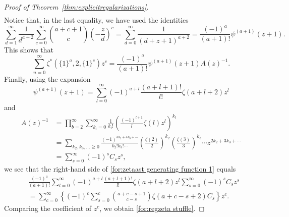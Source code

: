 \documentclass[12pt]{amsart}%
\theoremstyle{definition}
\begin{document}
\begin{proof}[Proof of Theorem~\ref{thm:explicitregularizations}]
\begin{align*}
\end{align*}
Notice that, in the last equality, 
we have used the identities 
\[
\sum^{\infty}_{d=1}\frac{1}{d^{a+2}}\sum^{\infty}_{c=0}\binom{a+c+1}{c}\left(-\frac{z}{d}\right)^c
=\sum^{\infty}_{d=0}\frac{1}{(d+z+1)^{a+2}}
=\frac{(-1)^a}{(a+1)!}\psi^{(a+1)}(z+1).
\]
This shows that 
\begin{equation}
\label{for:zetaast generating function 1}
 \sum^{\infty}_{n=0}\zeta^{\ast}(\{1\}^a,2,\{1\}^c)z^c
=\frac{(-1)^a}{(a+1)!}\psi^{(a+1)}(z+1)A(z)^{-1}.
\end{equation}
Finally, using the expansion
\[
\psi^{(a+1)}(z+1)
=\sum^{\infty}_{l=0}(-1)^{a+l}\frac{(a+l+1)!}{l!}\zeta(a+l+2)z^{l} 
\]
and 
\begin{align*}
A(z)^{-1}
&=\prod^{\infty}_{b=2}\sum^{\infty}_{k_l=0}\frac{1}{k_l!}\left(\frac{(-1)^{l+1}}{l}\zeta(l)z^l\right)^{k_l}\\
&=\sum_{k_2,k_3,\ldots\ge 0}\frac{(-1)^{3k_2+4k_3+\cdots}}{k_2!k_3!\cdots}
\left(\frac{\zeta(2)}{2}\right)^{k_2}
\left(\frac{\zeta(3)}{3}\right)^{k_3}\cdots
z^{2k_2+3k_3+\cdots}\\
&=\sum^{\infty}_{s=0}(-1)^sC_sz^s,
\end{align*}
we see that the right-hand side of \eqref{for:zetaast generating function 1} equals 
\begin{align*}
&\frac{(-1)^a}{(a+1)!}
\sum^{\infty}_{l=0}(-1)^{a+l}\frac{(a+l+1)!}{l!}\zeta(a+l+2)z^{l} 
\sum^{\infty}_{s=0}(-1)^sC_sz^s\\
&=\sum^{\infty}_{c=0}
\left\{(-1)^c\sum^{c}_{s=0}\binom{a+c-s+1}{c-s}
\zeta(a+c-s+2)C_s\right\}z^c.
\end{align*}
Comparing the coefficient of $z^c$,
we obtain \eqref{for:regzeta stuffle}.
\end{proof}
\end{document}
